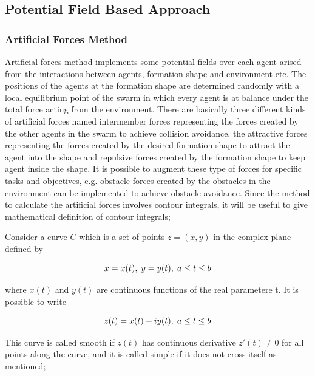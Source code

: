 \subsection{Potential Field Based Approach}

\subsubsection{Artificial Forces Method}
Artificial forces method implements some potential fields over each agent arised from the interactions between agents, formation shape and environment etc. The positions of the agents at the formation shape  are determined randomly with a local equilibrium point of the swarm in which every agent is at balance under the total force acting from the environment. There are basically three different kinds of artificial forces named intermember forces representing the forces created by the other agents in the swarm to achieve collision avoidance, the attractive forces representing the forces created by the desired formation shape to attract the agent into the shape and repulsive forces created by the formation shape to keep agent inside the shape. It is possible to augment these type of forces for specific tasks and objectives, e.g. obstacle forces created by the obstacles in the environment can be implemented to achieve obstacle avoidance.
Since the method to calculate the artificial forces involves contour integrals, it will be useful to give mathematical definition of contour integrals;
		
Consider a curve $C$ which is a set of points $z = (x,y)$ in the complex plane defined by

\begin{equation}
x = x(t),   \hspace{0.1cm} y = y(t),  \hspace{0.1cm} a\leq t \leq b
\end{equation}

where $x(t)$ and $y(t)$ are continuous functions of the real parametere t.  It is possible to write
		
\begin{equation}
z(t) = x(t)+iy(t),   \hspace{0.1cm} a\leq t \leq b
\end{equation}
		
This curve is called smooth if $z(t)$ has continuous derivative $z'(t) \neq 0$ for all points along the curve, and it is called simple if it does not cross itself as mentioned;

